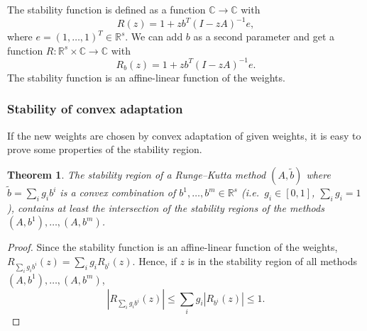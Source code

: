 \documentclass[a4paper]{article}
\numberwithin{equation}{section}
\theoremstyle{plain}
\newtheorem{theorem}{Theorem}
\theoremstyle{definition}
\numberwithin{theorem}{section}
\newcommand{\R}{\mathbb{R}}
\newcommand{\CN}{\mathbb{C}}
\newcommand{\1}{\mathbbm{1}}
\newcommand{\bt}{\tilde{b}}
\begin{document}
The stability function is defined as a function $\CN \to \CN$ with
\begin{equation}
R(z) = 1 + zb^T(I - zA)^{-1}e,
\end{equation}
where $e = (1, \dots, 1)^T \in \R^s$.
We can add $b$ as a second parameter and get a function
$R\colon \R^s \times \CN  \to \CN$ with
\begin{equation}
R_b(z) = 1 + zb^T(I - zA)^{-1}e.
\end{equation}
The stability function is an affine-linear function of the weights.



\subsubsection{Stability of convex adaptation}

If the new weights are chosen by convex adaptation of given weights,
it is easy to prove some properties of the stability region.
\begin{theorem}
  The stability region of a Runge--Kutta method $(A,\bt)$ where
  $\bt = \sum_{i} g_i b^i$ is a convex combination of
  $b^1, \dots, b^m \in \R^s$ (i.e.\ $g_i \in [0,1]$, $\sum_i g_i = 1$),
  contains at least the intersection of the stability regions of
  the methods $(A,b^1), \dots, (A,b^m)$.
\end{theorem}
\begin{proof}
  Since the stability function is an affine-linear function of the
  weights, $R_{\sum_i g_i b^i}(z) = \sum_i g_i R_{b^i}(z)$. Hence,
  if $z$ is in the stability region of all methods $(A,b^1), \dots, (A,b^m)$,
  \begin{equation}
    | R_{\sum_i g_i b^i}(z) |
    \le
    \sum_i g_i | R_{b^i}(z) |
    \le
    1.
  \end{equation}
\end{proof}
\end{document}
